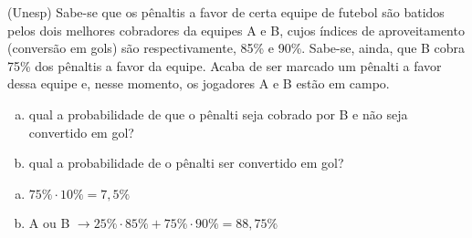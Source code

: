\begin{ex}
 (Unesp) Sabe-se que os pênaltis a favor de certa equipe de futebol são batidos pelos dois melhores cobradores da equipes A e B, cujos índices de aproveitamento (conversão em gols) são respectivamente, 85\% e 90\%. Sabe-se, ainda, que B cobra 75\% dos pênaltis a favor da equipe. Acaba de ser marcado um pênalti a favor dessa equipe e, nesse momento, os jogadores A e B estão em campo.
    \begin{enumerate}[(a)]
    \item qual a probabilidade de que o pênalti seja cobrado por B e não seja convertido em gol?
    \item qual a probabilidade de o pênalti ser convertido em gol?
    \end{enumerate}
      \begin{sol}
        \phantom{A} 
        \begin{enumerate} [(a)]
            \item $75\%\cdot10\%=7,5\%$
            \item A ou B\hspace{0,4cm} $\rightarrow 25\%\cdot85\%+75\%\cdot90\%=88,75\%$
        \end{enumerate}
      \end{sol}
\end{ex}